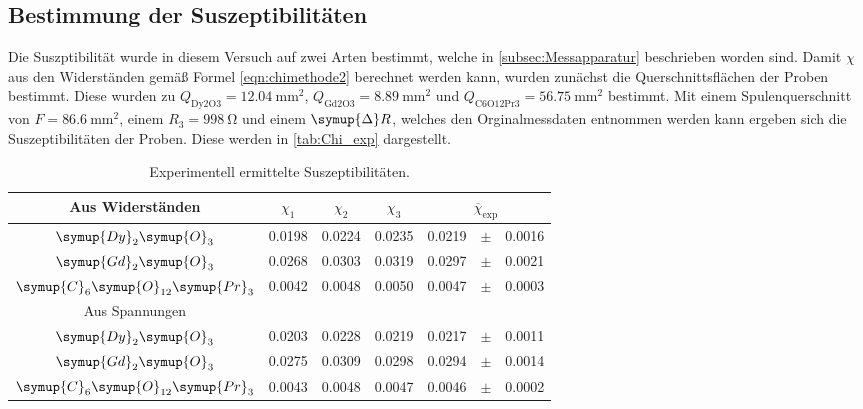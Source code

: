 \subsection{Bestimmung der Suszeptibilitäten}
\label{subsec:A_Suszep}
Die Suszptibilität wurde in diesem Versuch auf zwei Arten bestimmt, welche in \autoref{subsec:Messapparatur} beschrieben worden sind. Damit $\chi$ aus den Widerständen gemäß
Formel \eqref{eqn:chimethode2} berechnet werden kann, wurden zunächst die Querschnittsflächen der Proben bestimmt. Diese wurden zu 
$Q_{\text{Dy2O3}} = \qty{12.04}{\milli\metre\squared}$, $Q_{\text{Gd2O3}} = \qty{8.89}{\milli\metre\squared}$ und $Q_{\text{C6O12Pr3}} = \qty{56.75}{\milli\metre\squared}$
bestimmt. Mit einem Spulenquerschnitt von $F = \qty{86,6}{\milli\metre\squared}$, einem $R_3 = \qty{998}{\ohm}$ und einem $\symup{\Delta}R$, welches den Orginalmessdaten 
entnommen werden kann ergeben sich die Suszeptibilitäten der Proben. Diese werden in \autoref{tab:Chi_exp} dargestellt.
\begin{table}
  \centering
  \caption{Experimentell ermittelte Suszeptibilitäten.}
  \label{tab:Chi_exp}
  \begin{tabular}{c S[table-format = 1.4] S S r c l}
    \toprule
      {Aus Widerständen} & {$\chi_1$} & {$\chi_2$} & {$\chi_3$} &
        \\
    \midrule
      {$\symup{Dy}_2\symup{O}_3$}                 & 0.0198 & 0.0224 & 0.0235 & 0.0219 & {$\pm$} & 0.0016 \\
      {$\symup{Gd}_2\symup{O}_3$}                 & 0.0268 & 0.0303 & 0.0319 & 0.0297 & {$\pm$} & 0.0021 \\
      {$\symup{C}_6\symup{O}_{12}\symup{Pr}_3$}   & 0.0042 & 0.0048 & 0.0050 & 0.0047 & {$\pm$} & 0.0003 \\
    \bottomrule
      {Aus Spannungen} & & & & & \\
    \bottomrule 
      {$\symup{Dy}_2\symup{O}_3$}                 & 0.0203 & 0.0228 & 0.0219 & 0.0217 & {$\pm$} & 0.0011 \\
      {$\symup{Gd}_2\symup{O}_3$}                 & 0.0275 & 0.0309 & 0.0298 & 0.0294 & {$\pm$} & 0.0014 \\
      {$\symup{C}_6\symup{O}_{12}\symup{Pr}_3$}   & 0.0043 & 0.0048 & 0.0047 & 0.0046 & {$\pm$} & 0.0002 \\
    \bottomrule 
  \end{tabular}
\end{table}

